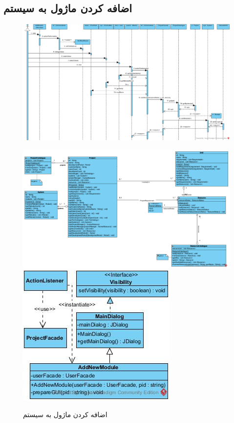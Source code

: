 \begin{landscape}
\newpage
\section{اضافه کردن ماژول به سیستم}
\begin{figure}[H]
	\centering
	\includegraphics[scale=0.55]{img/sequence-design/AddModuleToSystem}
\end{figure}
\begin{figure}[H]
	\centering
	\includegraphics[scale=0.4]{img/sequence-design/AddModuleToSystemC}
	\includegraphics[scale=0.65]{img/sequence-design/AddModuleToSystemUI}
	\caption{اضافه کردن ماژول به سیستم}
\end{figure}


\end{landscape}
